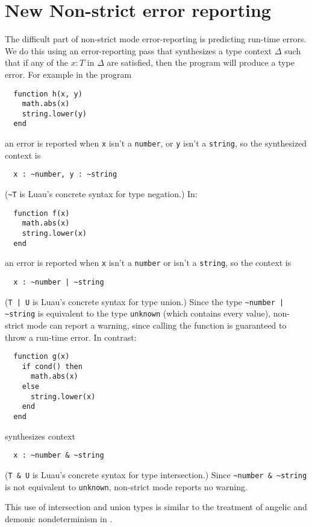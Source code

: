 \documentclass[sigplan]{acmart}
\begin{document}
\section{New Non-strict error reporting}

The difficult part of non-strict mode error-reporting is predicting
run-time errors. We do this using an error-reporting
pass that synthesizes a type context $\Delta$ such that if any of the $x : T$ in
$\Delta$ are satisfied, then the program will
produce a type error. For example in the program
\begin{verbatim}
  function h(x, y)
    math.abs(x)
    string.lower(y)
  end
\end{verbatim}
an error is reported when \verb|x| isn’t a \verb|number|, or \verb|y| isn’t a \verb|string|, so the synthesized context is
\begin{verbatim}
  x : ~number, y : ~string
\end{verbatim}
(\verb|~T| is Luau's concrete syntax for type negation.)
In:
\begin{verbatim}
  function f(x)
    math.abs(x)
    string.lower(x)
  end
\end{verbatim}
an error is reported when \verb|x| isn’t a \verb|number| or isn’t a \verb|string|, so the context is
\begin{verbatim}
  x : ~number | ~string
\end{verbatim}
(\verb"T | U" is Luau's concrete syntax for type union.)
Since the type \verb"~number | ~string" is equivalent to the type \verb|unknown| (which contains every value),
non-strict mode can report a warning, since calling the function is guaranteed to throw a run-time error.
In contrast:
\begin{verbatim}
  function g(x)
    if cond() then
      math.abs(x)
    else
      string.lower(x)
    end
  end
\end{verbatim}
synthesizes context
\begin{verbatim}
  x : ~number & ~string
\end{verbatim}
(\verb|T & U| is Luau's concrete syntax for type intersection.)
Since \verb|~number & ~string| is not equivalent to \verb|unknown|, non-strict mode reports no warning.

This use of intersection and union types is similar to the treatment of angelic
and demonic nondeterminism in \cite{???}.
\end{document}

